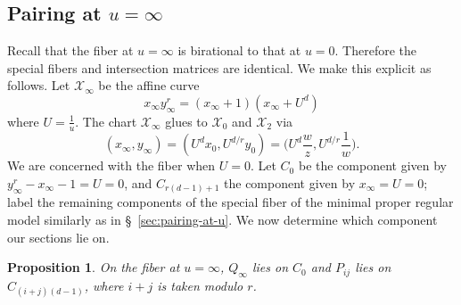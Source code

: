 \documentclass[reqno]{amsart}
\newtheorem{proposition}[thm]{Proposition}
\theoremstyle{definition}
\theoremstyle{remark}
\def\XX{\mathcal{X}}
\newcommand{\sxi}{\mathcal{X}_\infty}
\begin{document}


\subsection{Pairing at $u=\infty$}
\label{sec:pairing-at-u=infty}

Recall that the fiber at $u=\infty$ is birational to that at $u=0$. Therefore the special fibers and intersection matrices are identical. We make this explicit as follows. Let $\sxi$ be the affine curve
  \[
  x_\infty y_\infty^r = (x_\infty + 1)(x_\infty + {U^d})
  \]
  where $U = \frac{1}{u}$. The chart $\sxi$ glues to $\XX_0$ and $\XX_2$ via 
  \[
  (x_\infty, y_\infty) = (U^d x_0, U^{d/r} y_0) = \bigg(U^d \frac{w}{z}, U^{d/r} \frac{1}{w}\bigg).
  \]
  We are concerned with the fiber when $U = 0$. Let $C_0$ be the component given by $y_\infty^r - x_\infty - 1 = U = 0$, and $C_{r(d-1)+1}$ the component given by $x_\infty = U = 0$; label the remaining components of the special fiber of the minimal proper regular model similarly as in \S~\ref{sec:pairing-at-u}. We now determine which component our sections lie on.
\begin{proposition}
  On the fiber at $u=\infty$, $Q_\infty$ lies on $C_0$ and $P_{ij}$ lies on $C_{(i+j)(d-1)}$, where $i+j$ is taken modulo $r$. 
\end{proposition}
\end{document}
